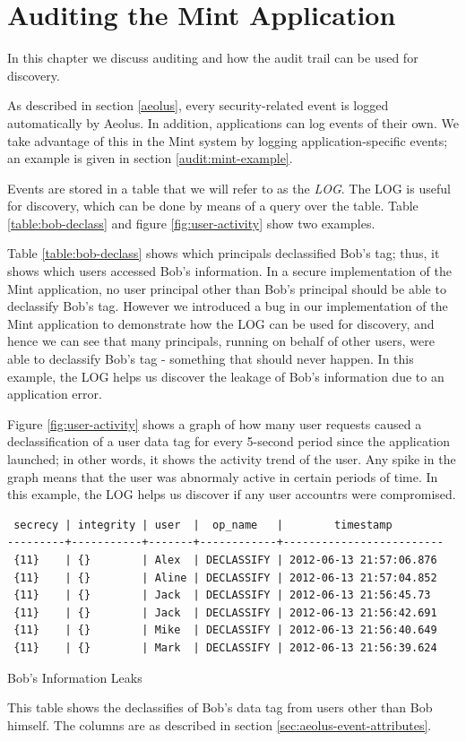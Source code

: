 \chapter{Auditing the Mint Application}
\label{mint:auditing}

In this chapter we discuss auditing and how the audit trail can be used for discovery.

As described in section \ref{aeolus}, every security-related event is logged automatically by Aeolus. In addition, applications can log events of their own. We take advantage of this in the Mint system by logging application-specific events; an example is given in section \ref{audit:mint-example}.

Events are stored in a table that we will refer to as the \emph{LOG}. The LOG is useful for discovery, which can be done by means of a query over the table. Table \ref{table:bob-declass} and figure \ref{fig:user-activity} show two examples.

Table \ref{table:bob-declass} shows which principals declassified Bob's tag; thus, it shows which users accessed Bob's information. In a secure implementation of the Mint application, no user principal other than Bob's principal should be able to declassify Bob's tag. However we introduced a bug in our implementation of the Mint application to demonstrate how the LOG can be used for discovery, and hence we can see that many principals, running on behalf of other users, were able to declassify Bob's tag - something that should never happen. In this example, the LOG helps us discover the leakage of Bob's information due to an application error.

Figure \ref{fig:user-activity} shows a graph of how many user requests caused a declassification of a user data tag for every 5-second period since the application launched; in other words, it shows the activity trend of the user. Any spike in the graph means that the user was abnormaly active in certain periods of time. In this example, the LOG helps us discover if any user accountrs were compromised.

\begin{table}[h]
\begin{verbatim}
 secrecy | integrity | user  |  op_name   |        timestamp        
---------+-----------+-------+------------+-------------------------
 {11}    | {}        | Alex  | DECLASSIFY | 2012-06-13 21:57:06.876
 {11}    | {}        | Aline | DECLASSIFY | 2012-06-13 21:57:04.852
 {11}    | {}        | Jack  | DECLASSIFY | 2012-06-13 21:56:45.73
 {11}    | {}        | Jack  | DECLASSIFY | 2012-06-13 21:56:42.691
 {11}    | {}        | Mike  | DECLASSIFY | 2012-06-13 21:56:40.649
 {11}    | {}        | Mark  | DECLASSIFY | 2012-06-13 21:56:39.624
\end{verbatim}
\caption*{Bob's Information Leaks}
\caption[Bob's Information Leaks]{This table shows the declassifies of Bob's data tag from users other than Bob himself. The columns are as described in section \ref{sec:aeolus-event-attributes}.}
\label{table:bob-declass}
\end{table}


